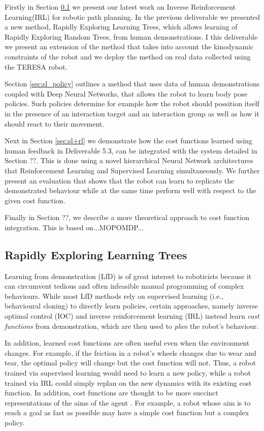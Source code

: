 \documentclass[a4paper,11pt]{report}
\begin{document}
Firstly in Section \ref{sec:rrt-iros} we present our latest work on Inverse Reinforcement Learning(IRL) for robotic path planning. In the previous deliverable we presented a new method, Rapidly Exploring Learning Trees, which allows learning of Rapidly Exploring Random Trees, from human demonstrations. I this deliverable we present an extension of the method that takes into account the kinodynamic constraints of the robot and we deploy the method on real data collected using the TERESA robot. 

Section \ref{sec:sl_policy} outlines a method that uses data of human demonstrations coupled with Deep Neural Networks, that allows the robot to learn body pose policies. Such policies determine for example how the robot should possition itself in the presence of an interaction target and an interaction group as well as how it should react to their movement.

Next in Section \ref{sec:sl+rl} we demonstrate how the cost functions learned using human feedback in Deliverable 5.3, can be integrated with the system detailed in Section ??. This is done using a novel hierarchical Neural Network architectures that Reinforcement Learning and Supervised Learning simultaneously. We further present an evaluation that shows that the robot can learn to replicate the demonstrated behaviour while at the same time perform well with respect to the given cost function.  

Finally in Section ??, we describe a more theoretical approach to cost function integration. This is based on...MOPOMDP...

\pagebreak


\subsection{Rapidly Exploring Learning Trees}
\label{sec:rrt-iros}

Learning from demonstration (LfD) \cite{argall2009survey} is of great interest to roboticists because it can circumvent tedious and often infeasible manual programming of complex behaviours. While most LfD methods rely on supervised learning (i.e., behavioural cloning) to directly learn policies, certain approaches, namely inverse optimal control (IOC) \cite{kalman1964linear} and inverse reinforcement learning (IRL) \cite{abbeel2004apprenticeship} instead learn \emph{cost functions} from demonstration, which are then used to \emph{plan} the robot's behaviour. 

In addition, learned cost functions are often useful even when the environment changes.  For example, if the friction in a robot's wheels changes due to wear and tear, the optimal policy will change but the cost function will not. Thus, a robot trained via supervised learning would need to learn a new policy, while a robot trained via IRL could simply replan on the new dynamics with its existing cost function. In addition, cost functions are thought to be more succinct representations of the aims of the agent \cite{abbeel2004apprenticeship}. For example, a robot whose aim is to reach a goal as fast as possible may have a simple cost function but a complex policy. 
\end{document}
